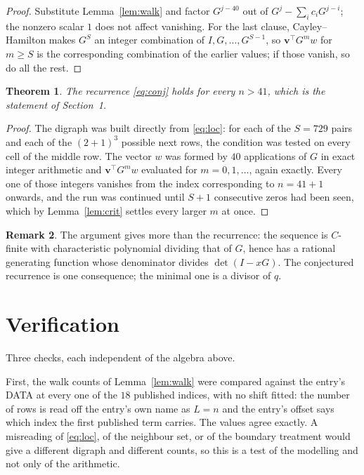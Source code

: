 \documentclass[11pt,a4paper]{article}
\theoremstyle{plain}
\newtheorem{theorem}{Theorem}
\theoremstyle{definition}
\newtheorem{remark}[theorem]{Remark}
\begin{document}
\begin{proof}
Substitute Lemma~\ref{lem:walk} and factor $G^{j-40}$ out of
$G^{j}-\sum_ic_iG^{j-i}$; the nonzero scalar $1$ does not affect
vanishing. For the last clause, Cayley--Hamilton makes $G^{S}$ an integer combination of
$I,G,\dots,G^{S-1}$, so $\mathbf{v}^{\!\top}G^{m}w$ for $m\ge S$ is the corresponding
combination of the earlier values; if those vanish, so do all the rest.
\end{proof}

\begin{theorem}
The recurrence \eqref{eq:conj} holds for every $n>41$, which is the statement of
Section~1.
\end{theorem}

\begin{proof}
The digraph was built directly from \eqref{eq:loc}: for each of the $S=729$ pairs and each
of the $(2+1)^{3}$ possible next rows, the condition was tested on every cell of
the middle row. The vector $w$ was formed by $40$ applications of $G$ in exact integer
arithmetic and $\mathbf{v}^{\!\top}G^{m}w$ evaluated for $m=0,1,\dots$, again exactly.
Every one of those integers vanishes from the index corresponding to $n=41+1$ onwards,
and the run was continued until $S+1$ consecutive zeros had been seen, which by
Lemma~\ref{lem:crit} settles every larger $m$ at once.
\end{proof}

\begin{remark}
The argument gives more than the recurrence: the sequence is $C$-finite with characteristic
polynomial dividing that of $G$, hence has a rational generating function whose denominator
divides $\det(I-xG)$. The conjectured recurrence is one consequence; the minimal one is a
divisor of $q$.
\end{remark}

\section{Verification}

Three checks, each independent of the algebra above.

First, the walk counts of Lemma~\ref{lem:walk} were compared against the entry's DATA at
every one of the $18$ published indices, with no shift fitted: the number of rows is
read off the entry's own name as $L=n$ and the entry's offset says which index the first
published term carries. The values agree exactly. A misreading of \eqref{eq:loc}, of the
neighbour set, or of the boundary treatment would give a different digraph and different
counts, so this is a test of the modelling and not only of the arithmetic.
\end{document}
